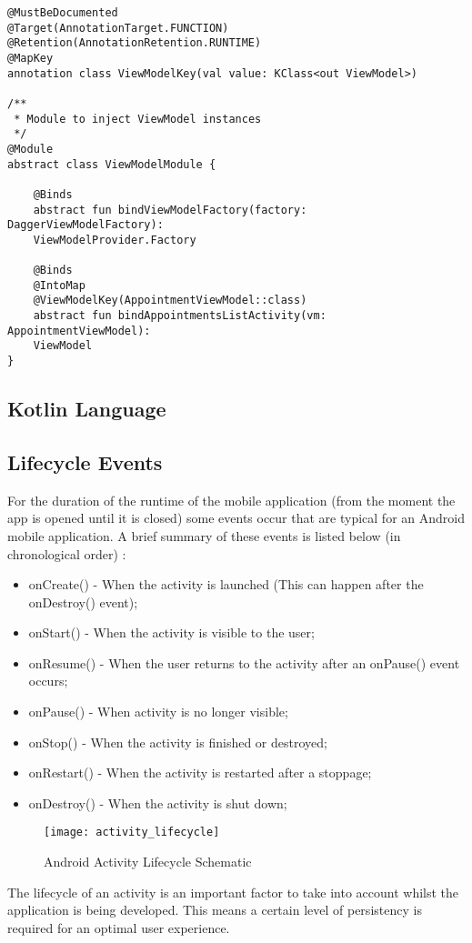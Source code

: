 \begin{verbatim}
@MustBeDocumented
@Target(AnnotationTarget.FUNCTION)
@Retention(AnnotationRetention.RUNTIME)
@MapKey
annotation class ViewModelKey(val value: KClass<out ViewModel>)

/**
 * Module to inject ViewModel instances
 */
@Module
abstract class ViewModelModule {

    @Binds
    abstract fun bindViewModelFactory(factory: DaggerViewModelFactory): 
    ViewModelProvider.Factory

    @Binds
    @IntoMap
    @ViewModelKey(AppointmentViewModel::class)
    abstract fun bindAppointmentsListActivity(vm: AppointmentViewModel): 
    ViewModel
}
\end{verbatim}

\subsection{Kotlin Language}
\subsection{Lifecycle Events}
For the duration of the runtime of the mobile application (from the moment the app is opened until it is closed) some events occur that are typical for an Android mobile application. A brief summary of these events is listed below (in chronological order) \cite{AndroidDeveloper2019}:
\begin{itemize}
\item onCreate() - When the activity is launched (This can happen after the onDestroy() event);
\item onStart() - When the activity is visible to the user;
\item onResume() - When the user returns to the activity after an onPause() event occurs;
\item onPause() - When activity is no longer visible;
\item onStop() - When the activity is finished or destroyed;
\item onRestart() - When the activity is restarted after a stoppage;
\item onDestroy() - When the activity is shut down;
\end{itemize}
\begin{figure}[H]
\centering
\texttt{[image: activity\_lifecycle]}
\caption{Android Activity Lifecycle Schematic~\cite{AndroidDeveloper2019}}
\end{figure}
The lifecycle of an activity is an important factor to take into account whilst the application is being developed. This means a certain level of persistency is required for an optimal user experience.
